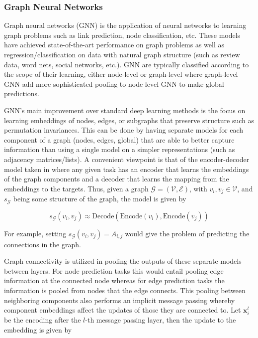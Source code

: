 \subsubsection{Graph Neural Networks}


Graph neural networks (GNN) is the application of neural networks to learning graph problems such as link prediction, node classification, etc. These models have achieved state-of-the-art performance on graph problems as well as regression/classification on data with natural graph structure (such as review data, word nets, social networks, etc.). GNN are typically classified according to the scope of their learning, either node-level or graph-level where graph-level GNN add more sophisticated pooling to node-level GNN to make global predictions. 

GNN's main improvement over standard deep learning methods is the focus on learning embeddings of nodes, edges, or subgraphs that preserve structure such as permutation invariances. This can be done by having separate models for each component of a graph (nodes, edges, global) that are able to better capture information than using a single model on a simpler representations (such as adjacency matrices/lists). A convenient viewpoint is that of the encoder-decoder model taken in \cite{Hamilton2017} where any given task has an encoder that learns the embeddings of the graph components and a decoder that learns the mapping from the embeddings to the targets. Thus, given a graph $\mathcal{G} = (\mathcal{V}, \mathcal{E})$, with $v_i, v_j \in \mathcal{V}$, and $s_{\mathcal{G}}$ being some structure of the graph, the model is given by

\begin{equation}
s_{\mathcal{G}}(v_i, v_j) \approx \text{Decode}(\text{Encode}(v_i), \text{Encode}(v_j))
\end{equation}

For example, setting $s_{\mathcal{G}}(v_i, v_j) = A_{i,j}$ would give the problem of predicting the connections in the graph.

Graph connectivity is utilized in pooling the outputs of these separate models between layers. For node prediction tasks this would entail pooling edge information at the connected node whereas for edge prediction tasks the information is pooled from nodes that the edge connects. This pooling between neighboring components also performs an implicit message passing whereby component embeddings affect the updates of those they are connected to. Let $\pmb{x}_i^{l}$ be the encoding after the $l$-th message passing layer, then the update to the embedding is given by


